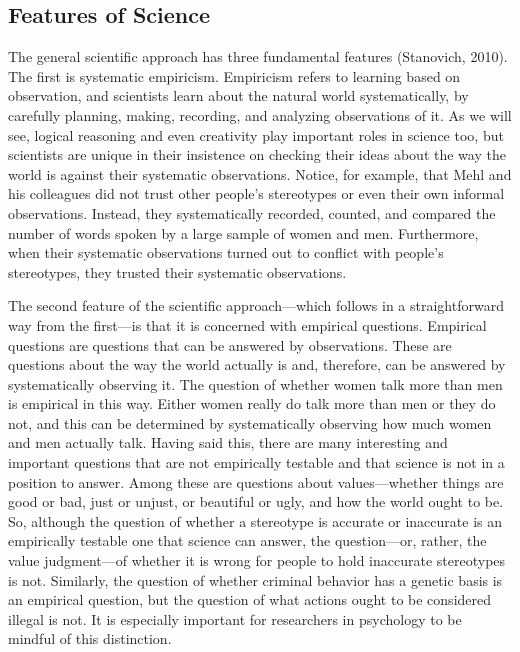 \documentclass[]{book}
\theoremstyle{definition}
\theoremstyle{definition}
\theoremstyle{remark}
\begin{document}
\subsection{Features of Science}\label{features-of-science}

The general scientific approach has three fundamental features
(Stanovich, 2010). The first is systematic empiricism. Empiricism refers
to learning based on observation, and scientists learn about the natural
world systematically, by carefully planning, making, recording, and
analyzing observations of it. As we will see, logical reasoning and even
creativity play important roles in science too, but scientists are
unique in their insistence on checking their ideas about the way the
world is against their systematic observations. Notice, for example,
that Mehl and his colleagues did not trust other people's stereotypes or
even their own informal observations. Instead, they systematically
recorded, counted, and compared the number of words spoken by a large
sample of women and men. Furthermore, when their systematic observations
turned out to conflict with people's stereotypes, they trusted their
systematic observations.

The second feature of the scientific approach---which follows in a
straightforward way from the first---is that it is concerned with
empirical questions. Empirical questions are questions that can be
answered by observations. These are questions about the way the world
actually is and, therefore, can be answered by systematically observing
it. The question of whether women talk more than men is empirical in
this way. Either women really do talk more than men or they do not, and
this can be determined by systematically observing how much women and
men actually talk. Having said this, there are many interesting and
important questions that are not empirically testable and that science
is not in a position to answer. Among these are questions about
values---whether things are good or bad, just or unjust, or beautiful or
ugly, and how the world ought to be. So, although the question of
whether a stereotype is accurate or inaccurate is an empirically
testable one that science can answer, the question---or, rather, the
value judgment---of whether it is wrong for people to hold inaccurate
stereotypes is not. Similarly, the question of whether criminal behavior
has a genetic basis is an empirical question, but the question of what
actions ought to be considered illegal is not. It is especially
important for researchers in psychology to be mindful of this
distinction.
\end{document}
